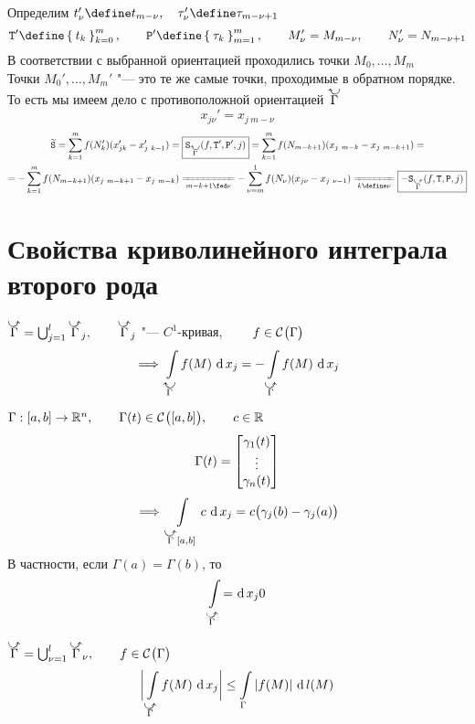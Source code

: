 \begin{property}
	Определим $ t_\nu' \define t_{m - \nu}, \quad \tau_\nu' \define \tau_{m - \nu + 1} $
	$$ \Teq' \define \seqz[m]{t_k}k, \qquad \Par' \define \seq[m]{\tau_k}m, \qquad M_\nu' = M_{m - \nu}, \qquad N_\nu' = N_{m - \nu + 1} $$
	В соответствии с выбранной ориентацией проходились точки $ M_0, \dots, M_m $ \\
	Точки $ M_0', \dots, M_m' $ "--- это те же самые точки, проходимые в обратном порядке. То есть мы имеем дело с противоположной ориентацией $ \curvedir[0]\Gamma $
	$$ x_{j\nu}' = x_{j ~ m - \nu} $$
	\begin{multline*}
		\vawe \Sr = \sum_{k = 1}^m f(N_k') (x_{jk}' - x_{j ~ k - 1}') = \boxed{\Sr_{\curvedir[0]\Gamma}(f, \Teq', \Par', j)} = \sum_{k = 1}^m f(N_{m - k + 1})(x_{j ~ m - k} - x_{j ~ m - k + 1}) = \\
		= -\sum_{k = 1}^m f(N_{m - k + 1})(x_{j ~ m - k + 1} - x_{j ~ m - k}) \undereq{m - k + 1 \fed \nu} -\sum_{\nu = m}^1 f(N_\nu)(x_{j\nu} - x_{j ~ \nu - 1}) \undereq{k \define \nu} \boxed{-\Sr_{\curvedir\Gamma}(f, \Teq, \Par, j)}
	\end{multline*}
\end{property}

\section{Свойства криволинейного интеграла второго рода}

\begin{props}
	\item $ \curvedir\Gamma = \bigcup_{j = 1}^l \curvedir\Gamma_j, \qquad \curvedir\Gamma_j $ "--- $ C^1 $-кривая, $ \qquad f \in \mathcal{C}^{} \big( {\Gamma} \big)  $
	$$ \implies \cint[x_j]{\curvedir[0]\Gamma}{f(M)} = -\cint[x_j]{\curvedir\Gamma}{f(M)} $$

	\item $ \Gamma : [a, b] \to \mathbb{R}^n, \qquad \Gamma(t) \in \mathcal{C}^{} \big( {[a, b]} \big) , \qquad c \in \mathbb{R} $
	$$ \Gamma(t) =  \begin{bmatrix} {\gamma_1(t)} \\ \vdots \\ {\gamma_n(t)} \end{bmatrix}  $$
	$$ \implies \cint[x_j]{\curvedir\Gamma[a, b]}c = c \big( \gamma_j(b) - \gamma_j(a) \big) $$
	В частности, если $ \Gamma(a) = \Gamma(b) $, то
	$$ \cint[x_j]{\curvedir\Gamma} = 0 $$

	\item $ \curvedir\Gamma = \bigcup_{\nu = 1}^l \curvedir\Gamma_\nu, \qquad f \in \Cont\Gamma $
	$$ \bigg| \cint[x_j]{\curvedir\Gamma}{f(M)} \bigg| \le \cint\Gamma{|f(M)|} $$
\end{props}

